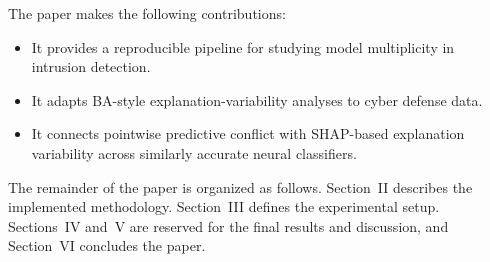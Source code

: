 The paper makes the following contributions:
\begin{itemize}
    \item It provides a reproducible pipeline for studying model multiplicity in intrusion detection.
    \item It adapts BA-style explanation-variability analyses to cyber defense data.
    \item It connects pointwise predictive conflict with SHAP-based explanation variability across similarly accurate neural classifiers.
\end{itemize}

The remainder of the paper is organized as follows. Section~II describes the implemented methodology. Section~III defines the experimental setup. Sections~IV and~V are reserved for the final results and discussion, and Section~VI concludes the paper.

